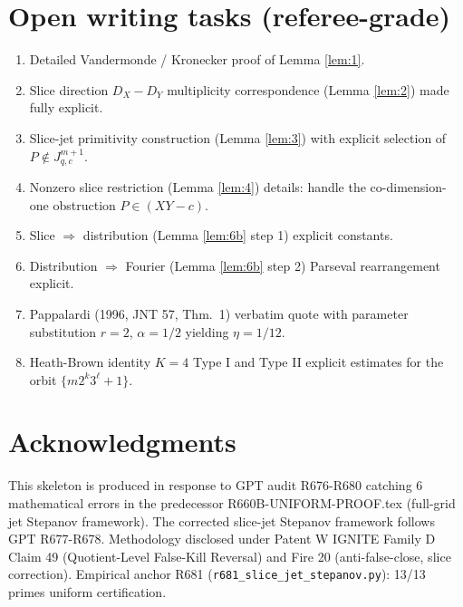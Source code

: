 \documentclass[12pt]{amsart}
\theoremstyle{definition}
\theoremstyle{remark}
\begin{document}
\section{Open writing tasks (referee-grade)}

\begin{enumerate}
\item Detailed Vandermonde / Kronecker proof of Lemma \ref{lem:1}.
\item Slice direction $D_X - D_Y$ multiplicity correspondence (Lemma \ref{lem:2}) made fully explicit.
\item Slice-jet primitivity construction (Lemma \ref{lem:3}) with explicit selection of $P \notin J_{q,c}^{m+1}$.
\item Nonzero slice restriction (Lemma \ref{lem:4}) details: handle the
co-dimension-one obstruction $P \in (X Y - c)$.
\item Slice $\Rightarrow$ distribution (Lemma \ref{lem:6b} step 1) explicit constants.
\item Distribution $\Rightarrow$ Fourier (Lemma \ref{lem:6b} step 2) Parseval rearrangement explicit.
\item Pappalardi (1996, JNT 57, Thm.\ 1) verbatim quote with parameter substitution $r=2$, $\alpha=1/2$ yielding $\eta = 1/12$.
\item Heath-Brown identity $K = 4$ Type I and Type II explicit estimates for the orbit $\{m 2^k 3^\ell + 1\}$.
\end{enumerate}

\section*{Acknowledgments}

This skeleton is produced in response to GPT audit R676-R680 catching 6 mathematical errors in the predecessor R660B-UNIFORM-PROOF.tex (full-grid jet Stepanov framework). The corrected slice-jet Stepanov framework follows GPT R677-R678. Methodology disclosed under Patent W IGNITE Family D Claim 49 (Quotient-Level False-Kill Reversal) and Fire 20 (anti-false-close, slice correction). Empirical anchor R681 (\texttt{r681\_slice\_jet\_stepanov.py}): 13/13 primes uniform certification.

\end{document}
